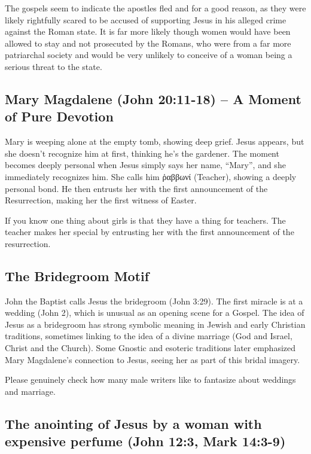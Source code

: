 The gospels seem to indicate the apostles fled and for a good reason, as they were likely rightfully scared to be accused of supporting Jesus in his alleged crime against the Roman state.
It is far more likely though women would have been allowed to stay and not prosecuted by the Romans, who were from a far more patriarchal society and would be very unlikely to conceive of a woman being a serious threat to the state.

\subsection{Mary Magdalene (John 20:11-18) -- A Moment of Pure Devotion}\label{subsec:mary-magdalene-john-2011-18-a-moment-of-pure-devotion}

Mary is weeping alone at the empty tomb, showing deep grief.
Jesus appears, but she doesn't recognize him at first, thinking he's the gardener.
The moment becomes deeply personal when Jesus simply says her name, ``Mary'', and she immediately recognizes him.
She calls him ῥαββωνί (Teacher), showing a deeply personal bond.
He then entrusts her with the first announcement of the Resurrection, making her the first witness of Easter.

If you know one thing about girls is that they have a thing for teachers.
The teacher makes her special by entrusting her with the first announcement of the resurrection.

\subsection{The Bridegroom Motif}\label{subsec:the-bridegroom-motif}

John the Baptist calls Jesus the bridegroom (John 3:29).
The first miracle is at a wedding (John 2), which is unusual as an opening scene for a Gospel.
The idea of Jesus as a bridegroom has strong symbolic meaning in Jewish and early Christian traditions, sometimes linking to the idea of a divine marriage (God and Israel, Christ and the Church).
Some Gnostic and esoteric traditions later emphasized Mary Magdalene's connection to Jesus, seeing her as part of this bridal imagery.

Please genuinely check how many male writers like to fantasize about weddings and marriage.

\subsection{The anointing of Jesus by a woman with expensive perfume (John 12:3, Mark 14:3-9)}\label{subsec:the-anointing-of-jesus-by-a-woman-with-expensive-perfume-john-123-mark-143-9}

